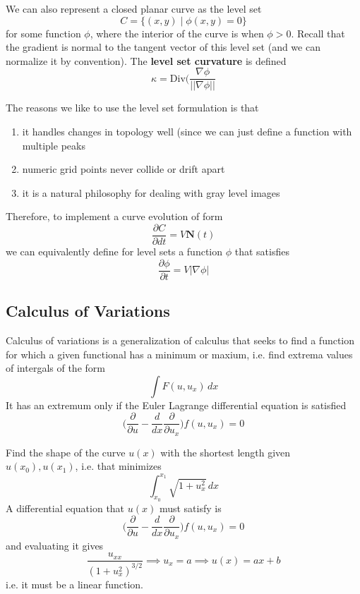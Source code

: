 \documentclass{article}
\begin{document}
    \begin{definition}
    We can also represent a closed planar curve as the level set 
    \[C = \{(x, y) \mid \phi(x, y) = 0\}\]
    for some function $\phi$, where the interior of the curve is when $\phi > 0$. Recall that the gradient is normal to the tangent vector of this level set (and we can normalize it by convention). The \textbf{level set curvature} is defined 
    \[\kappa = \mathrm{Div} \bigg( \frac{\nabla \phi}{||\nabla \phi||}\]
    \end{definition}

    The reasons we like to use the level set formulation is that 
    \begin{enumerate}
        \item it handles changes in topology well (since we can just define a function with multiple peaks 
        \item numeric grid points never collide or drift apart 
        \item it is a natural philosophy for dealing with gray level images 
    \end{enumerate}

    Therefore, to implement a curve evolution of form 
    \[\frac{\partial C}{\partial dt} = V \mathbf{N}(t)\]
    we can equivalently define for level sets a function $\phi$ that satisfies 
    \[\frac{\partial \phi}{\partial t} = V |\nabla \phi|\]

  \subsection{Calculus of Variations}

    \begin{definition}
    Calculus of variations is a generalization of calculus that seeks to find a function for which a given functional has a minimum or maxium, i.e. find extrema values of intergals of the form 
    \[\int F(u, u_x) \,dx\]
    It has an extremum only if the Euler Lagrange differential equation is satisfied 
    \[ \bigg( \frac{\partial}{\partial u} - \frac{d}{dx} \frac{\partial}{\partial u_x} \bigg) f(u, u_x) = 0\]
    \end{definition}

    \begin{example}
    Find the shape of the curve $u(x)$ with the shortest length given $u(x_0), u(x_1)$, i.e. that minimizes 
    \[\int_{x_0}^{x_1} \sqrt{1 + u_x^2} \,dx\]
    A differential equation that $u(x)$ must satisfy is 
    \[ \bigg( \frac{\partial}{\partial u} - \frac{d}{dx} \frac{\partial}{\partial u_x} \bigg) f(u, u_x) = 0\]
    and evaluating it gives 
    \[\frac{u_{xx}}{(1 + u_x^2)^{3/2}} \implies u_x = a \implies u(x) = ax + b\]
    i.e. it must be a linear function. 
    \end{example}
\end{document}
